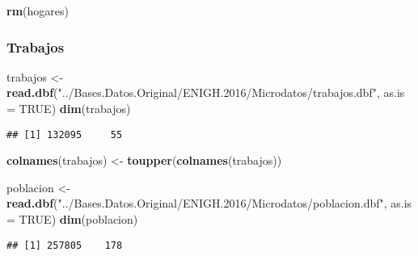 \documentclass[11pt,]{article}
\newenvironment{Shaded}{\begin{snugshade}}{\end{snugshade}}
\newcommand{\KeywordTok}[1]{\textcolor[rgb]{0.13,0.29,0.53}{\textbf{#1}}}
\newcommand{\DataTypeTok}[1]{\textcolor[rgb]{0.13,0.29,0.53}{#1}}
\newcommand{\StringTok}[1]{\textcolor[rgb]{0.31,0.60,0.02}{#1}}
\newcommand{\OtherTok}[1]{\textcolor[rgb]{0.56,0.35,0.01}{#1}}
\newcommand{\NormalTok}[1]{#1}
\begin{document}
\begin{Shaded}
\begin{Highlighting}[]
\KeywordTok{rm}\NormalTok{(hogares)}
\end{Highlighting}
\end{Shaded}

\subsubsection{Trabajos}\label{trabajos}

\begin{Shaded}
\begin{Highlighting}[]
\NormalTok{trabajos <-}\StringTok{ }\KeywordTok{read.dbf}\NormalTok{(}\StringTok{"../Bases.Datos.Original/ENIGH.2016/Microdatos/trabajos.dbf"}\NormalTok{, }
                       \DataTypeTok{as.is =} \OtherTok{TRUE}\NormalTok{)}
\KeywordTok{dim}\NormalTok{(trabajos)}
\end{Highlighting}
\end{Shaded}

\begin{verbatim}
## [1] 132095     55
\end{verbatim}

\begin{Shaded}
\begin{Highlighting}[]
\KeywordTok{colnames}\NormalTok{(trabajos) <-}\StringTok{ }\KeywordTok{toupper}\NormalTok{(}\KeywordTok{colnames}\NormalTok{(trabajos))}

\NormalTok{poblacion <-}\StringTok{ }\KeywordTok{read.dbf}\NormalTok{(}\StringTok{"../Bases.Datos.Original/ENIGH.2016/Microdatos/poblacion.dbf"}\NormalTok{, }
                       \DataTypeTok{as.is =} \OtherTok{TRUE}\NormalTok{)}
\KeywordTok{dim}\NormalTok{(poblacion)}
\end{Highlighting}
\end{Shaded}

\begin{verbatim}
## [1] 257805    178
\end{verbatim}
\end{document}
